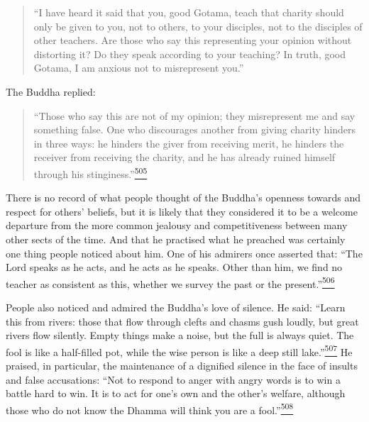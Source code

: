 \begin{quote}
``I have heard it said that you, good Gotama, teach that charity should
only be given to you, not to others, to your disciples, not to the
disciples of other teachers. Are those who say this representing your
opinion without distorting it? Do they speak according to your teaching?
In truth, good Gotama, I am anxious not to misrepresent you.''
\end{quote}

The Buddha replied:

\begin{quote}
``Those who say this are not of my opinion; they misrepresent me and say
something false. One who discourages another from giving charity hinders
in three ways: he hinders the giver from receiving merit, he hinders the
receiver from receiving the charity, and he has already ruined himself
through his
stinginess.''\label{footprints_split_013.html_fnref505}\hyperref[footprints_split_025.htmlux5cux23fn505]{\textsuperscript{505}}
\end{quote}

There is no record of what people thought of the Buddha's openness
towards and respect for others' beliefs, but it is likely that they
considered it to be a welcome departure from the more common jealousy
and competitiveness between many other sects of the time. And that he
practised what he preached was certainly one thing people noticed about
him. One of his admirers once asserted that: ``The Lord speaks as he
acts, and he acts as he speaks. Other than him, we find no teacher as
consistent as this, whether we survey the past or the
present.''\label{footprints_split_013.html_fnref506}\hyperref[footprints_split_025.htmlux5cux23fn506]{\textsuperscript{506}}

People also noticed and admired the Buddha's love of silence. He said:
``Learn this from rivers: those that flow through clefts and chasms gush
loudly, but great rivers flow silently. Empty things make a noise, but
the full is always quiet. The fool is like a half-filled pot, while the
wise person is like a deep still
lake.''\label{footprints_split_013.html_fnref507}\hyperref[footprints_split_025.htmlux5cux23fn507]{\textsuperscript{507}}
He praised, in particular, the maintenance of a dignified silence in the
face of insults and false accusations: ``Not to respond to anger with
angry words is to win a battle hard to win. It is to act for one's own
and the other's welfare, although those who do not know the Dhamma will
think you are a
fool.''\label{footprints_split_013.html_fnref508}\hyperref[footprints_split_025.htmlux5cux23fn508]{\textsuperscript{508}}

